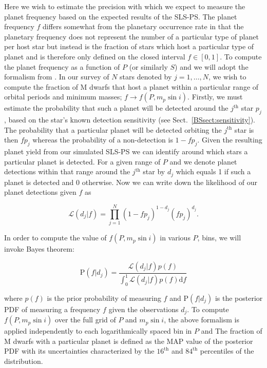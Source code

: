 Here we wish to estimate the precision with which we expect to measure the
planet frequency based on the expected results of the SLS-PS. The planet frequency
$f$ differs somewhat from the planetary occurrence rate in that the planetary frequency does not
represent the number of a particular type of planet per host star but instead is the fraction
of stars which host a particular type of planet and is therefore only defined on the closed
interval $f \in [0,1]$.
To compute the planet frequency as a function of $P$ (or similarly $S$) and \msini{,}
we will adopt the formalism from \cite{carson06, lafreniere07b}. In our survey of $N$
stars denoted by $j=1,\dots,N$, we wish to compute the fraction of M dwarfs that host
a planet within a particular range of orbital periods and minimum masses; $f \to f(P,m_p\sin{i})$.
Firstly, we must estimate the probability that such a planet will be detected around
the $j^{\text{th}}$ star $p_j$, based on the star's known detection sensitivity (see
Sect.~\ref{BSsect:sensitivity}). The probability that a particular planet will be detected orbiting
the $j^{\text{th}}$ star is then $fp_j$ whereas the probability of a non-detection is $1-fp_j$.
Given the resulting planet yield from our simulated SLS-PS we can identify around which stars
a particular planet is detected. For a given range of $P$ and \msini{,} we denote
planet detections within that range around the $j^{\text{th}}$ star by $d_j$ which equals 1
if such a planet is detected and 0 otherwise. Now we can write down the likelihood of our
planet detections given $f$ as

\begin{equation}
  \mathcal{L}(d_j|f) = \prod_{j=1}^{N} (1-fp_j)^{1-d_j} (fp_j)^{d_j}.
  \label{BSeq:freqlike}
\end{equation}

In order to compute the value of $f(P,m_p\sin{i})$ in various $P$,\msini{} bins,
we will invoke Bayes theorem:

\begin{equation}
  \text{P}(f|d_j) = \frac{\mathcal{L}(d_j|f) p(f)}{\int_{0}^{1} \mathcal{L}(d_j|f) p(f) \text{d}f}
  \label{BSeq:freqpost}
\end{equation}

\noindent where $p(f)$ is the prior probability of measuring $f$ and 
P$(f|d_j)$ is the posterior PDF of measuring a frequency $f$ given the
observations $d_j$. To compute $f(P,m_p\sin{i})$ over the full grid of $P$ and
$m_p\sin{i}$, the above formalism is applied independently to each logarithmically spaced bin in
$P$ and  The fraction of M dwarfs with a particular planet is defined as the
MAP value of the posterior PDF with its uncertainties characterized by the
$16^{\text{th}}$ and $84^{\text{th}}$ percentiles of the distribution. \\

